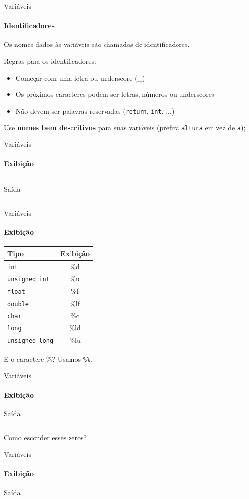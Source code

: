 \documentclass{beamer}
\begin{document}
\begin{frame}{Variáveis}
	\framesubtitle{Identificadores}
	Os nomes dados às variáveis são chamados de \alert{identificadores}.
	
	Regras para os identificadores:
	\begin{itemize}
		\item Começar com uma letra ou underscore (\_)
		\item Os próximos caracteres podem ser letras, números ou underscores
		\item Não devem ser palavras reservadas (\texttt{return}, \texttt{int}, ...)
	\end{itemize}
	Use \textbf{nomes bem descritivos} para suas variáveis (prefira \alert{\texttt{altura}} em vez de \alert{\texttt{a}});
\end{frame}
\begin{frame}[fragile]{Variáveis}
	\framesubtitle{Exibição}
	\inputminted{c}{resources/showvars.c}
	\begin{block}{Saída}
		\inputminted{text}{resources/showvarsout.txt}
	\end{block}
\end{frame}
\begin{frame}{Variáveis}
	\framesubtitle{Exibição}
	\begin{table}[!b]
		{\carlitoTLF
			\begin{tabularx}{\textwidth}{Xc}
				\textbf{Tipo} & \textbf{Exibição} \\
				\toprule
				\texttt{int}               & \%d \\
				\texttt{unsigned int}      & \%u \\
				\texttt{float}             & \%f \\
				\texttt{double}            & \%lf \\
				\texttt{char}              & \%c  \\
				\texttt{long}              & \%ld  \\
				\texttt{unsigned long}     & \%lu  \\
				\bottomrule
			\end{tabularx}}
		\end{table}
		\pause
		E o caractere \alert{\%}? \pause Usamos \alert{\texttt{\%\%}}.
\end{frame}
\begin{frame}{Variáveis}
	\framesubtitle{Exibição}
	\begin{block}{Saída}
		\inputminted{text}{resources/showvarsout.txt}
	\end{block}
	Como esconder esses zeros?
\end{frame}
\begin{frame}[fragile]{Variáveis}
	\framesubtitle{Exibição}
	\begin{block}{Saída}
		\inputminted{text}{resources/decimalplaces.txt}
	\end{block}
\end{frame}
\end{document}
